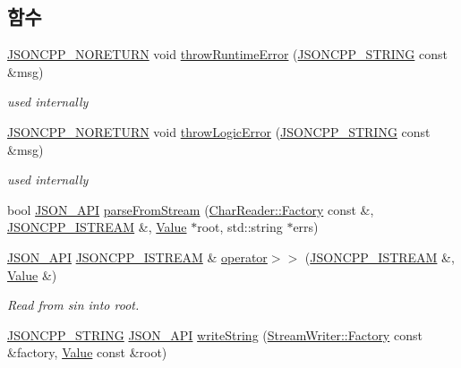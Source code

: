 \subsection*{함수}
\begin{DoxyCompactItemize}
\item 
\hyperlink{json_8h_a78c5ba441d8b48f24a5095b97f01f282}{J\+S\+O\+N\+C\+P\+P\+\_\+\+N\+O\+R\+E\+T\+U\+RN} void \hyperlink{namespace_json_a0ab7ff7f99788262d92d9ff3d924e065}{throw\+Runtime\+Error} (\hyperlink{json_8h_a1e723f95759de062585bc4a8fd3fa4be}{J\+S\+O\+N\+C\+P\+P\+\_\+\+S\+T\+R\+I\+NG} const \&msg)
\begin{DoxyCompactList}\small\item\em used internally \end{DoxyCompactList}\item 
\hyperlink{json_8h_a78c5ba441d8b48f24a5095b97f01f282}{J\+S\+O\+N\+C\+P\+P\+\_\+\+N\+O\+R\+E\+T\+U\+RN} void \hyperlink{namespace_json_a27790f21f17922fac81e7cd72a5659a5}{throw\+Logic\+Error} (\hyperlink{json_8h_a1e723f95759de062585bc4a8fd3fa4be}{J\+S\+O\+N\+C\+P\+P\+\_\+\+S\+T\+R\+I\+NG} const \&msg)
\begin{DoxyCompactList}\small\item\em used internally \end{DoxyCompactList}\item 
bool \hyperlink{json_8h_a1d61ffde86ce1a18fd83194ff0d9a206}{J\+S\+O\+N\+\_\+\+A\+PI} \hyperlink{namespace_json_aab0cf1ecf81d1aeca12be2a416a84352}{parse\+From\+Stream} (\hyperlink{class_json_1_1_char_reader_1_1_factory}{Char\+Reader\+::\+Factory} const \&, \hyperlink{json_8h_a15f2f70b2ce0a2abd0f8112393dbc4de}{J\+S\+O\+N\+C\+P\+P\+\_\+\+I\+S\+T\+R\+E\+AM} \&, \hyperlink{class_json_1_1_value}{Value} $\ast$root, std\+::string $\ast$errs)
\item 
\hyperlink{json_8h_a1d61ffde86ce1a18fd83194ff0d9a206}{J\+S\+O\+N\+\_\+\+A\+PI} \hyperlink{json_8h_a15f2f70b2ce0a2abd0f8112393dbc4de}{J\+S\+O\+N\+C\+P\+P\+\_\+\+I\+S\+T\+R\+E\+AM} \& \hyperlink{namespace_json_a244ed0996aba750c40c1641c06bba449}{operator$>$$>$} (\hyperlink{json_8h_a15f2f70b2ce0a2abd0f8112393dbc4de}{J\+S\+O\+N\+C\+P\+P\+\_\+\+I\+S\+T\+R\+E\+AM} \&, \hyperlink{class_json_1_1_value}{Value} \&)
\begin{DoxyCompactList}\small\item\em Read from \textquotesingle{}sin\textquotesingle{} into \textquotesingle{}root\textquotesingle{}. \end{DoxyCompactList}\item 
\hyperlink{json_8h_a1e723f95759de062585bc4a8fd3fa4be}{J\+S\+O\+N\+C\+P\+P\+\_\+\+S\+T\+R\+I\+NG} \hyperlink{json_8h_a1d61ffde86ce1a18fd83194ff0d9a206}{J\+S\+O\+N\+\_\+\+A\+PI} \hyperlink{namespace_json_a00820c0084189e2a7533531c0f250e3f}{write\+String} (\hyperlink{class_json_1_1_stream_writer_1_1_factory}{Stream\+Writer\+::\+Factory} const \&factory, \hyperlink{class_json_1_1_value}{Value} const \&root)

\end{DoxyCompactItemize}
